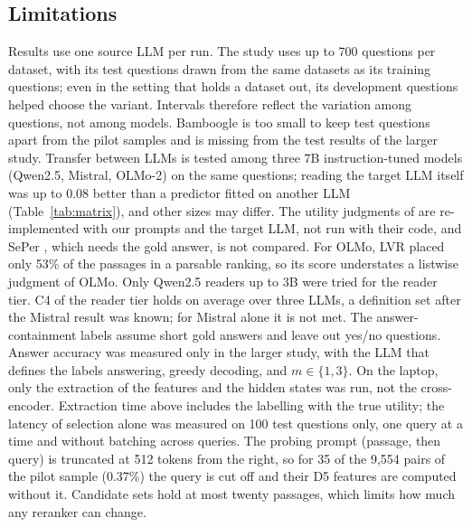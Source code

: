 \documentclass[preprint,12pt,authoryear]{elsarticle}
\begin{document}
\subsection{Limitations}\label{sec:limits}
Results use one source LLM per run. The study uses up to 700 questions per dataset, with its test questions drawn from the same datasets as its training questions; even in the setting that holds a dataset out, its development questions helped choose the variant. Intervals therefore reflect the variation among questions, not among models. Bamboogle is too small to keep test questions apart from the pilot samples and is missing from the test results of the larger study. Transfer between LLMs is tested among three 7B instruction-tuned models (Qwen2.5, Mistral, OLMo-2) on the same questions; reading the target LLM itself was up to 0.08 better than a predictor fitted on another LLM (Table~\ref{tab:matrix}), and other sizes may differ. The utility judgments of \citet{zhang2025c} are re-implemented with our prompts and the target LLM, not run with their code, and SePer \citep{dai2025}, which needs the gold answer, is not compared. For OLMo, LVR placed only 53\% of the passages in a parsable ranking, so its score understates a listwise judgment of OLMo. Only Qwen2.5 readers up to 3B were tried for the reader tier. C4 of the reader tier holds on average over three LLMs, a definition set after the Mistral result was known; for Mistral alone it is not met. The answer-containment labels assume short gold answers and leave out yes/no questions. Answer accuracy was measured only in the larger study, with the LLM that defines the labels answering, greedy decoding, and $m \in \{1, 3\}$. On the laptop, only the extraction of the features and the hidden states was run, not the cross-encoder. Extraction time above includes the labelling with the true utility; the latency of selection alone was measured on 100 test questions only, one query at a time and without batching across queries. The probing prompt (passage, then query) is truncated at 512 tokens from the right, so for 35 of the 9,554 pairs of the pilot sample (0.37\%) the query is cut off and their D5 features are computed without it. Candidate sets hold at most twenty passages, which limits how much any reranker can change.
\end{document}
